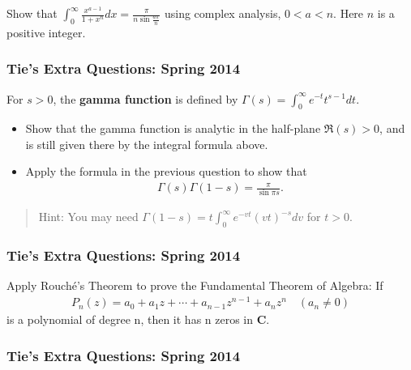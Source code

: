Show that
\(\displaystyle \int_0^\infty \frac{x^{a-1}}{1+x^n} dx=\frac{\pi}{n\sin \frac{a\pi}{n}}\)
using complex analysis, \(0< a < n\). Here \(n\) is a positive integer.

\hypertarget{ties-extra-questions-spring-2014-4}{%
\subsubsection{Tie's Extra Questions: Spring
2014}\label{ties-extra-questions-spring-2014-4}}

For \(s>0\), the \textbf{gamma function} is defined by
\(\displaystyle{\Gamma(s)=\int_0^{\infty} e^{-t}t^{s-1} dt}\).

\begin{itemize}
\item
  Show that the gamma function is analytic in the half-plane
  \(\Re (s)>0\), and is still given there by the integral formula above.
\item
  Apply the formula in the previous question to show that
  \begin{align*}\Gamma(s)\Gamma(1-s)=\frac{\pi}{\sin \pi s}.\end{align*}
\end{itemize}

\begin{quote}
Hint: You may need
\(\displaystyle{\Gamma(1-s)=t \int_0^{\infty}e^{-vt}(vt)^{-s} dv}\) for
\(t>0\).
\end{quote}

\hypertarget{ties-extra-questions-spring-2014-5}{%
\subsubsection{Tie's Extra Questions: Spring
2014}\label{ties-extra-questions-spring-2014-5}}

Apply Rouché's Theorem to prove the Fundamental Theorem of Algebra: If
\begin{align*}P_n(z) = a_0 + a_1z + \cdots + a_{n-1}z^{n-1} + a_nz^n\quad  (a_n \neq 0)\end{align*}
is a polynomial of degree n, then it has n zeros in \(\mathbf C\).

\hypertarget{ties-extra-questions-spring-2014-6}{%
\subsubsection{Tie's Extra Questions: Spring
2014}\label{ties-extra-questions-spring-2014-6}}

